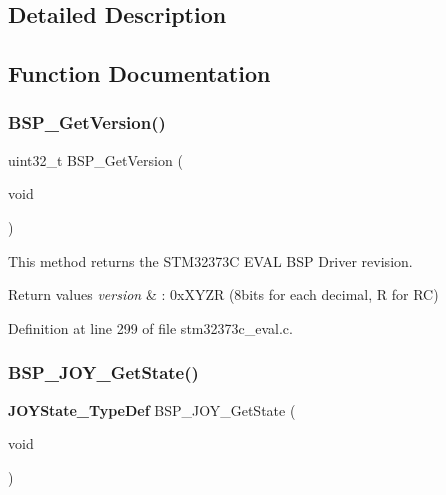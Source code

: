 \subsection{Detailed Description}


\subsection{Function Documentation}
\mbox{\label{group___exported___functions_ga65d13608f7010a8068614154cb142cd6}} 
\subsubsection{B\+S\+P\+\_\+\+Get\+Version()}
{\footnotesize\ttfamily uint32\+\_\+t B\+S\+P\+\_\+\+Get\+Version (\begin{DoxyParamCaption}\item[{void}]{ }\end{DoxyParamCaption})}



This method returns the S\+T\+M32373C E\+V\+AL B\+SP Driver revision. 


\begin{DoxyRetVals}{Return values}
{\em version} & \+: 0x\+X\+Y\+ZR (8bits for each decimal, R for RC) \\
\hline
\end{DoxyRetVals}


Definition at line 299 of file stm32373c\+\_\+eval.\+c.

\mbox{\label{group___exported___functions_gac978098a78085c416a176458d850c807}} 
\subsubsection{B\+S\+P\+\_\+\+J\+O\+Y\+\_\+\+Get\+State()}
{\footnotesize\ttfamily \textbf{ J\+O\+Y\+State\+\_\+\+Type\+Def} B\+S\+P\+\_\+\+J\+O\+Y\+\_\+\+Get\+State (\begin{DoxyParamCaption}\item[{void}]{ }\end{DoxyParamCaption})}



